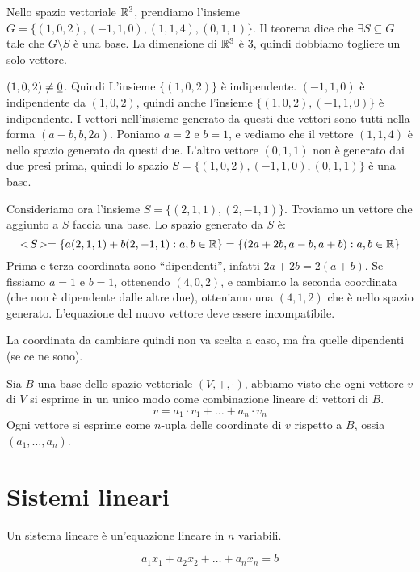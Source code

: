 \begin{exmp}
Nello spazio vettoriale $\mathbb{R}^3$, prendiamo l'insieme $G = \{ (1, 0, 2), (-1, 1, 0), (1, 1, 4), (0, 1, 1) \}$. Il teorema dice che $\exists S \subseteq G$ tale che $G \setminus S$ \`e una base. La dimensione di $\mathbb{R}^3$ \`e 3, quindi dobbiamo togliere un solo vettore.

$(1,0,2) \neq \underline{0}$. Quindi L'insieme $\{ (1, 0, 2) \}$ \`e indipendente. $(-1, 1, 0)$ \`e indipendente da $(1, 0, 2)$, quindi anche l'insieme $\{ (1, 0, 2), (-1, 1, 0)\}$ \`e indipendente. I vettori nell'insieme generato da questi due vettori sono tutti nella forma $(a - b, b, 2a)$. Poniamo $a = 2$ e $b = 1$, e vediamo che il vettore $(1, 1, 4)$ \`e nello spazio generato da questi due. L'altro vettore $(0, 1, 1)$ non \`e generato dai due presi prima, quindi lo spazio $S = \{ (1, 0, 2), (-1, 1, 0), (0, 1, 1)\}$ \`e una base.

Consideriamo ora l'insieme $S = \{ (2, 1, 1), (2, -1, 1) \}$. Troviamo un vettore che aggiunto a $S$ faccia una base. Lo spazio generato da $S$ \`e:
\[
<\!{S}\!> = \{ a (2, 1, 1) + b (2, -1, 1) : a, b \in \mathbb{R} \} = \{ (2a + 2b, a - b, a + b) : a, b \in \mathbb{R} \}
\]
Prima e terza coordinata sono ``dipendenti'', infatti $2a + 2b = 2 (a + b)$. Se fissiamo $a = 1$ e $b = 1$, ottenendo $(4, 0, 2)$, e cambiamo la seconda coordinata (che non \`e dipendente dalle altre due), otteniamo una $(4, 1, 2)$ che \`e nello spazio generato. L'equazione del nuovo vettore deve essere incompatibile.

La  coordinata da cambiare quindi non va scelta a caso, ma fra quelle dipendenti (se ce ne sono). 
\end{exmp}

Sia $B$ una base dello spazio vettoriale $(V, +, \cdot)$, abbiamo visto che ogni vettore $v$ di $V$ si esprime in un unico modo come combinazione lineare di vettori di $B$.
\[
v = a_1 \cdot v_1 + \dots + a_n \cdot v_n
\]
Ogni vettore si esprime come $n$-upla delle coordinate di $v$ rispetto a $B$, ossia $(a_1, \dots, a_n)$.


\section{Sistemi lineari}

Un sistema lineare \`e un'equazione lineare in $n$ variabili.

\[
a_1 x_1 + a_2 x_2 + \dots + a_n x_n = b
\]

